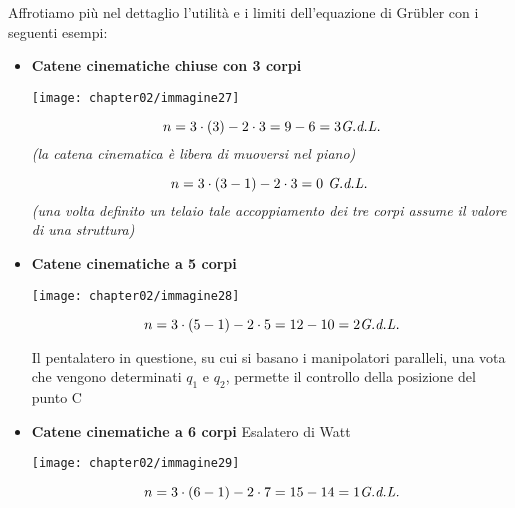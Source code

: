 	Affrotiamo più nel dettaglio l'utilità e i limiti dell'equazione di Gr\"ubler con i seguenti esempi:
	\begin{itemize}
	\item \textbf{Catene cinematiche chiuse con 3 corpi}\newline
	\begin{minipage}{.25\textwidth}
	\centering
	 \texttt{[image: chapter02/immagine27]}
	 \end{minipage}
	 \hfill
	 \begin{minipage}{.75\textwidth}
		\[n = 3 \cdot (3) - 2 \cdot 3 = 9-6 = 3 \emph{G.d.L.}\]
		\emph{ (la catena cinematica è libera di muoversi nel piano)}
		\vspace{3mm}
		
		\[n = 3 \cdot (3 - 1) -2 \cdot 3 = 0 \emph{ G.d.L. }\]
		\emph{(una volta definito un telaio tale accoppiamento dei tre corpi assume il valore di una struttura)}

	\end{minipage}
		
		\item \textbf{Catene cinematiche a 5 corpi}
		\vspace{1mm}
		
			\begin{minipage}{.25\textwidth}
			\centering
				\texttt{[image: chapter02/immagine28]}
			\end{minipage}
			\hfill
			\begin{minipage}{.65\textwidth}
			\begin{equation*}
			n = 3 \cdot (5 - 1) - 2 \cdot 5 = 12- 10 = 2 \emph{G.d.L.}
			\end{equation*}

			Il pentalatero in questione, su cui si basano i manipolatori paralleli, una vota che vengono determinati $q_1$ e $q_2$, permette il controllo della posizione del punto C
						\end{minipage}		
			\item  \textbf{Catene cinematiche a 6 corpi}\newline
				Esalatero di Watt\newline
				\begin{minipage}{.25\textwidth}
					\centering
					\texttt{[image: chapter02/immagine29]}
				\end{minipage}
				\hfill
				\begin{minipage}{.75\textwidth}
				\begin{equation*}
					n = 3 \cdot (6 - 1) - 2 \cdot 7 = 15-14 = 1 \emph{G.d.L.}
				\end{equation*}
				\end{minipage}
				

\end{itemize}
